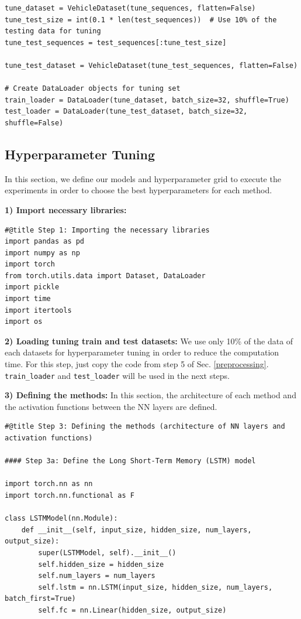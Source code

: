 \documentclass[journal,onecolumn]{IEEEtran}
\begin{document}
{\begin{appendices}
\begin{verbatim}
tune_dataset = VehicleDataset(tune_sequences, flatten=False)
tune_test_size = int(0.1 * len(test_sequences))  # Use 10% of the testing data for tuning
tune_test_sequences = test_sequences[:tune_test_size]

tune_test_dataset = VehicleDataset(tune_test_sequences, flatten=False)

# Create DataLoader objects for tuning set
train_loader = DataLoader(tune_dataset, batch_size=32, shuffle=True)
test_loader = DataLoader(tune_test_dataset, batch_size=32, shuffle=False)
\end{verbatim}

\clearpage
\subsection{Hyperparameter Tuning} \label{tuning-annex}
In this section, we define our models and hyperparameter grid to execute the experiments in order to choose the best hyperparameters for each method.

\textbf{1) Import necessary libraries:}
\begin{verbatim}
#@title Step 1: Importing the necessary libraries
import pandas as pd
import numpy as np
import torch
from torch.utils.data import Dataset, DataLoader
import pickle
import time
import itertools
import os
\end{verbatim}

\textbf{2) Loading tuning train and test datasets: } We use only 10\% of the data of each datasets for hyperparameter tuning in order to reduce the computation time. For this step, just copy the code from step 5 of Sec. \ref{preprocessing}. \texttt{train\_loader} and \texttt{test\_loader} will be used in the next steps.

\textbf{3) Defining the methods:} In this section, the architecture of each method and the activation functions between the NN layers are defined.
\begin{verbatim}
#@title Step 3: Defining the methods (architecture of NN layers and activation functions)

#### Step 3a: Define the Long Short-Term Memory (LSTM) model

import torch.nn as nn
import torch.nn.functional as F

class LSTMModel(nn.Module):
    def __init__(self, input_size, hidden_size, num_layers, output_size):
        super(LSTMModel, self).__init__()
        self.hidden_size = hidden_size
        self.num_layers = num_layers
        self.lstm = nn.LSTM(input_size, hidden_size, num_layers, batch_first=True)
        self.fc = nn.Linear(hidden_size, output_size)


\end{verbatim}
\end{appendices}}
\end{document}
